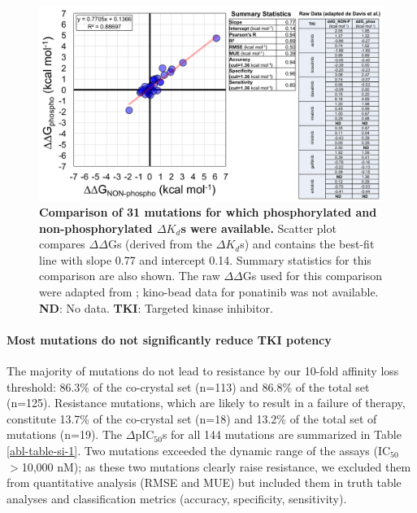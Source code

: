 \documentclass[phd,tocprelim]{cornell}
\begin{document}
\begin{landscape}
	\begin{figure}[p]
		\centering
		\includegraphics[width=0.8\linewidth]{figures/abl-supplementary-figure-1.pdf}
		\caption[Comparison of 31 mutations for which phosphorylated and non-phosphorylated $\Delta K_{d}$s were available.]{
			{\bf Comparison of 31 mutations for which phosphorylated and non-phosphorylated $\Delta K_{d}$s were available.}
			Scatter plot compares $\Delta\Delta$Gs (derived from the $\Delta K_{d}$s) and contains the best-fit line with slope 0.77 and intercept 0.14. Summary statistics for this comparison are also shown. The raw $\Delta\Delta$Gs used for this comparison were adapted from \protect\cite{Davis:Nat.Biotechnol.:2011}; kino-bead data for ponatinib was not available. \textbf{ND}: No data. \textbf{TKI}: Targeted kinase inhibitor.
		}
		\label{fig:abl-figure-si-1}
	\end{figure}
\end{landscape}

\paragraph{Most mutations do not significantly reduce TKI potency}
The majority of mutations do not lead to resistance by our 10-fold affinity loss threshold: 86.3\% of the co-crystal set (n=113) and 86.8\% of the total set (n=125).
Resistance mutations, which are likely to result in a failure of therapy, constitute 13.7\% of the co-crystal set (n=18) and 13.2\% of the total set of mutations (n=19).
The $\Delta$pIC$_{50}$s for all 144 mutations are summarized in Table \ref{abl-table-si-1}. %
Two mutations exceeded the dynamic range of the assays (IC$_{50}$ $>$10,000 nM); as these two mutations clearly raise resistance, we excluded them from quantitative analysis (RMSE and MUE) but included them in truth table analyses and classification metrics (accuracy, specificity, sensitivity).
\end{document}
